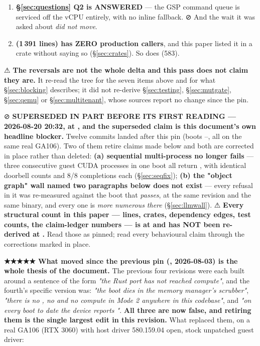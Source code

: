 \documentclass[10.5pt]{article}
\begin{document}
\begin{claimbox}
\begin{enumerate}
{  GAP, not a property of the path}, and this paper built a normative rule on it
  (\S\ref{sec:trust}). The census had no row for the transport RM actually uses.
\item \textbf{\S\ref{sec:questions} Q2 is ANSWERED} --- the GSP command queue is serviced off the
  vCPU entirely, with no inline fallback. ⊘ And the wait it was asked about \emph{did not move}.
\item \textbf{ (1\,391 lines) has ZERO production callers}, and this paper listed it
  in a \built{} crate without saying so (\S\ref{sec:crates}). So does  (583).
\end{enumerate}
⚠ \textbf{The reversals are not the whole delta and this pass does not claim they are.} It
re-read the tree for the seven items above and for what \S\ref{sec:blocking} describes; it did
not re-derive \S\ref{sec:testing}, \S\ref{sec:mutgate}, \S\ref{sec:qemu} or
\S\ref{sec:multitenant}, whose sources report no change since the pin.

\smallskip
⊘ \textbf{SUPERSEDED IN PART BEFORE ITS FIRST READING --- 2026-08-20 20:32, at ,
and the superseded claim is this document's own headline blocker.} Twelve commits landed after
this pin (boots --, all on the same real GA106). Two of them retire claims
made below and both are corrected in place rather than deleted:
\textbf{(a) sequential multi-process no longer fails} --- three consecutive guest CUDA processes
in one boot all return , with identical doorbell counts and 8/8 completions each
(\S\ref{sec:seqfix}); \textbf{(b) the "object graph" wall named two paragraphs below does not
exist} --- every refusal in it was re-measured against the boot that \emph{passes}, at the same
revision and the same binary, and every one is \emph{more numerous there} (\S\ref{sec:llmwall}).
⚠ \textbf{Every structural count in this paper --- lines, crates, dependency edges, test counts,
the claim-ledger numbers --- is \measured{} at  and has NOT been re-derived at
.} Read those as pinned; read every behavioural claim through the corrections
marked in place.

\smallskip
\textbf{★★★★★ What moved since the previous pin (, 2026-08-03) is the whole thesis
of the document.} The previous four revisions were each built around a sentence of the form
\emph{"the Rust port has not reached compute"}, and the fourth's specific version was: \emph{"the
boot dies in the memory manager's scrubber"}, \emph{"there is no , no
 and no compute in Mode 2 anywhere in this codebase"}, and \emph{"on every boot
to date the device reports "}. \textbf{All three are now false, and
retiring them is the single largest edit in this revision.} What replaced them, on a real GA106
(RTX 3060) with host driver 580.159.04 open, stock unpatched guest driver:


\end{claimbox}
\end{document}
